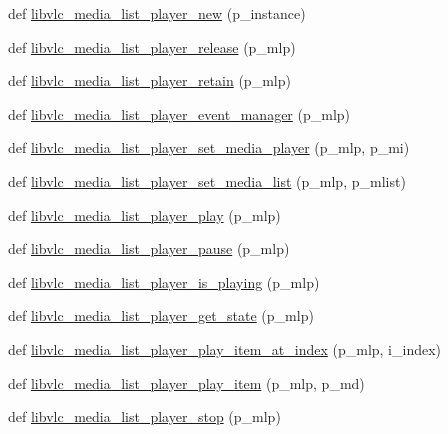 \begin{DoxyCompactItemize}
\item 
def \hyperlink{namespacesrc_1_1lib_1_1vlc_a39126b9b92bdb6cc609aa9e8546c30b7}{libvlc\+\_\+media\+\_\+list\+\_\+player\+\_\+new} (p\+\_\+instance)
\item 
def \hyperlink{namespacesrc_1_1lib_1_1vlc_a90a107a867ef5cb54811046211c13e4c}{libvlc\+\_\+media\+\_\+list\+\_\+player\+\_\+release} (p\+\_\+mlp)
\item 
def \hyperlink{namespacesrc_1_1lib_1_1vlc_af9e507052eb1ee6b78923f928416ac9e}{libvlc\+\_\+media\+\_\+list\+\_\+player\+\_\+retain} (p\+\_\+mlp)
\item 
def \hyperlink{namespacesrc_1_1lib_1_1vlc_a83c82615c9c73ebbe6d84cd8e6470922}{libvlc\+\_\+media\+\_\+list\+\_\+player\+\_\+event\+\_\+manager} (p\+\_\+mlp)
\item 
def \hyperlink{namespacesrc_1_1lib_1_1vlc_a16f4de803cb877a89c4f705c5410d4d5}{libvlc\+\_\+media\+\_\+list\+\_\+player\+\_\+set\+\_\+media\+\_\+player} (p\+\_\+mlp, p\+\_\+mi)
\item 
def \hyperlink{namespacesrc_1_1lib_1_1vlc_a518cc9483d92567f188d5f2f020d1d68}{libvlc\+\_\+media\+\_\+list\+\_\+player\+\_\+set\+\_\+media\+\_\+list} (p\+\_\+mlp, p\+\_\+mlist)
\item 
def \hyperlink{namespacesrc_1_1lib_1_1vlc_af9df9c9e4fd06b0ee5f6d856a8e44c22}{libvlc\+\_\+media\+\_\+list\+\_\+player\+\_\+play} (p\+\_\+mlp)
\item 
def \hyperlink{namespacesrc_1_1lib_1_1vlc_a0afd5c8435a979463f7f46e9b7d4b5d4}{libvlc\+\_\+media\+\_\+list\+\_\+player\+\_\+pause} (p\+\_\+mlp)
\item 
def \hyperlink{namespacesrc_1_1lib_1_1vlc_afadbfdbef7d4045456c8358fa5c3a3dc}{libvlc\+\_\+media\+\_\+list\+\_\+player\+\_\+is\+\_\+playing} (p\+\_\+mlp)
\item 
def \hyperlink{namespacesrc_1_1lib_1_1vlc_a82b74ecc4c06171cd6ae67b3d1ee6114}{libvlc\+\_\+media\+\_\+list\+\_\+player\+\_\+get\+\_\+state} (p\+\_\+mlp)
\item 
def \hyperlink{namespacesrc_1_1lib_1_1vlc_a4f8cc9f067baeab388fcb3df0b4f013a}{libvlc\+\_\+media\+\_\+list\+\_\+player\+\_\+play\+\_\+item\+\_\+at\+\_\+index} (p\+\_\+mlp, i\+\_\+index)
\item 
def \hyperlink{namespacesrc_1_1lib_1_1vlc_a15c34c7bff3619123b1922db56eb821a}{libvlc\+\_\+media\+\_\+list\+\_\+player\+\_\+play\+\_\+item} (p\+\_\+mlp, p\+\_\+md)
\item 
def \hyperlink{namespacesrc_1_1lib_1_1vlc_ab5170f89ac5dcab6e2ce2dad294cde52}{libvlc\+\_\+media\+\_\+list\+\_\+player\+\_\+stop} (p\+\_\+mlp)

\end{DoxyCompactItemize}
